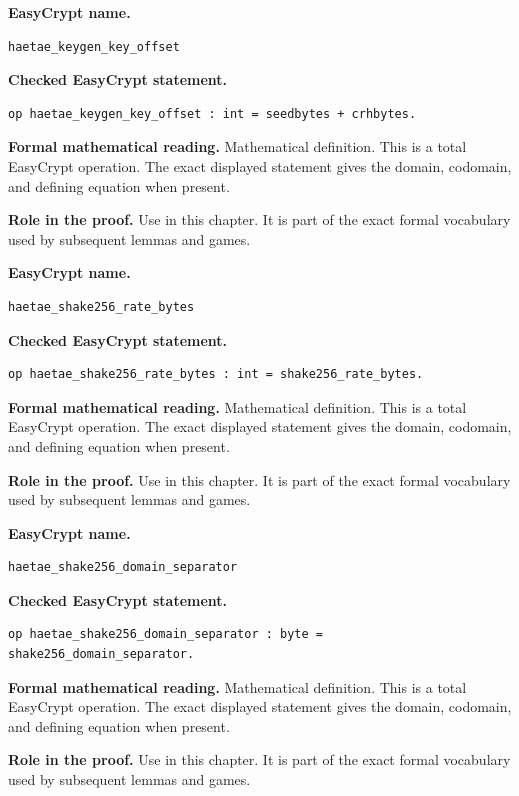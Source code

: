 \begin{formaldefinition}
\noindent\textbf{EasyCrypt name.}
\begin{lstlisting}[language=EasyCrypt,basicstyle=\ttfamily\scriptsize]
haetae_keygen_key_offset
\end{lstlisting}
\noindent\textbf{Checked EasyCrypt statement.}
\begin{lstlisting}[language=EasyCrypt,basicstyle=\ttfamily\scriptsize]
op haetae_keygen_key_offset : int = seedbytes + crhbytes.
\end{lstlisting}
\noindent\textbf{Formal mathematical reading.}
Mathematical definition. This is a total EasyCrypt operation.  The exact displayed statement gives the domain, codomain, and defining equation when present.

\noindent\textbf{Role in the proof.}
Use in this chapter. It is part of the exact formal vocabulary used by subsequent lemmas and games.

\end{formaldefinition}

\begin{formaldefinition}
\noindent\textbf{EasyCrypt name.}
\begin{lstlisting}[language=EasyCrypt,basicstyle=\ttfamily\scriptsize]
haetae_shake256_rate_bytes
\end{lstlisting}
\noindent\textbf{Checked EasyCrypt statement.}
\begin{lstlisting}[language=EasyCrypt,basicstyle=\ttfamily\scriptsize]
op haetae_shake256_rate_bytes : int = shake256_rate_bytes.
\end{lstlisting}
\noindent\textbf{Formal mathematical reading.}
Mathematical definition. This is a total EasyCrypt operation.  The exact displayed statement gives the domain, codomain, and defining equation when present.

\noindent\textbf{Role in the proof.}
Use in this chapter. It is part of the exact formal vocabulary used by subsequent lemmas and games.

\end{formaldefinition}

\begin{formaldefinition}
\noindent\textbf{EasyCrypt name.}
\begin{lstlisting}[language=EasyCrypt,basicstyle=\ttfamily\scriptsize]
haetae_shake256_domain_separator
\end{lstlisting}
\noindent\textbf{Checked EasyCrypt statement.}
\begin{lstlisting}[language=EasyCrypt,basicstyle=\ttfamily\scriptsize]
op haetae_shake256_domain_separator : byte = shake256_domain_separator.
\end{lstlisting}
\noindent\textbf{Formal mathematical reading.}
Mathematical definition. This is a total EasyCrypt operation.  The exact displayed statement gives the domain, codomain, and defining equation when present.

\noindent\textbf{Role in the proof.}
Use in this chapter. It is part of the exact formal vocabulary used by subsequent lemmas and games.

\end{formaldefinition}

